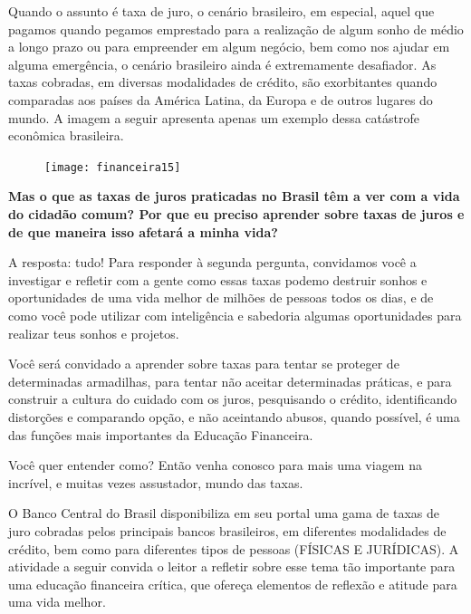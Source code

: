 Quando o assunto é taxa de juro, o cenário brasileiro, em  especial, aquel que pagamos quando pegamos emprestado para a realização de algum sonho de médio a longo prazo ou para empreender em algum negócio, bem como nos ajudar em alguma emergência, o cenário brasileiro ainda é extremamente desafiador. As taxas cobradas, em diversas modalidades de crédito, são exorbitantes quando comparadas aos países da América Latina, da Europa e de outros lugares do mundo. A imagem a seguir apresenta apenas um exemplo dessa catástrofe econômica brasileira.

\begin{figure}[H]
\centering

\texttt{[image: financeira15]}
\end{figure}


\textbf{Mas o que as taxas de juros praticadas no Brasil têm a ver com a vida do cidadão comum? Por que eu preciso aprender sobre taxas de juros e de que maneira isso afetará a minha vida?}

A resposta: tudo! Para responder à segunda pergunta, convidamos você a investigar e refletir com a gente como essas taxas podemo destruir sonhos e oportunidades de uma vida melhor de milhões de pessoas todos os dias, e de como você pode utilizar com inteligência e sabedoria algumas oportunidades para realizar teus sonhos e projetos.

Você será convidado a aprender sobre taxas para tentar se proteger de determinadas armadilhas, para tentar não aceitar determinadas práticas, e para construir a cultura do cuidado com os juros, pesquisando o crédito, identificando distorções e comparando opção, e não aceintando abusos, quando possível, é uma das funções mais importantes da Educação Financeira.

Você quer entender como? Então venha conosco para mais uma viagem na incrível, e muitas vezes assustador, mundo das taxas.

O Banco Central do Brasil disponibiliza em seu portal uma gama de taxas de juro cobradas pelos principais bancos brasileiros, em diferentes modalidades de crédito, bem como para diferentes tipos de pessoas (FÍSICAS E JURÍDICAS). A atividade a seguir convida o leitor a refletir sobre esse tema tão importante para uma educação financeira crítica, que ofereça elementos de reflexão e atitude para uma vida melhor. 

